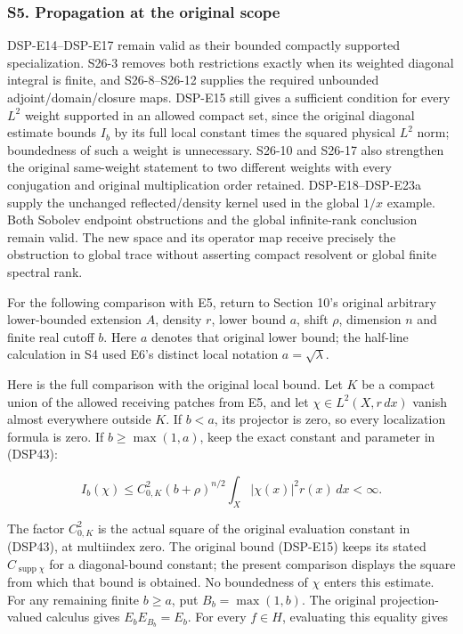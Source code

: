 \documentclass[
  11pt,
]{article}
\makeatletter
\let\ReaderOriginalAnchorStart\hyper@anchorstart
\let\ReaderOriginalAnchorEnd\hyper@anchorend
\let\ReaderPendingAliases\@empty
\def\ReaderArmAliases#1{\gdef\ReaderPendingAliases{#1}}
\def\hyper@anchorstart#1{\ReaderIfNativeAnchorTF{#1}{\ReaderPendingAliases\global\let\ReaderPendingAliases\@empty}{}\ReaderOriginalAnchorStart{#1}}
\makeatother
\begin{document}
\ReaderArmAliases{\ReaderOriginalAnchorStart{s5.-propagation-at-the-original-scope}\ReaderOriginalAnchorEnd}
\subsubsection{S5. Propagation at the original
scope}\label{s5.-propagation-at-the-original-scope}

DSP-E14--DSP-E17 remain valid as their bounded compactly supported
specialization. S26-3 removes both restrictions exactly when its
weighted diagonal integral is finite, and S26-8--S26-12 supplies the
required unbounded adjoint/domain/closure maps. DSP-E15 still gives a
sufficient condition for every \(L^2\) weight supported in an allowed
compact set, since the original diagonal estimate bounds \(I_b\) by its
full local constant times the squared physical \(L^2\) norm; boundedness
of such a weight is unnecessary. S26-10 and S26-17 also strengthen the
original same-weight statement to two different weights with every
conjugation and original multiplication order retained.
DSP-E18--DSP-E23a supply the unchanged reflected/density kernel used in
the global \(1/x\) example. Both Sobolev endpoint obstructions and the
global infinite-rank conclusion remain valid. The new space and its
operator map receive precisely the obstruction to global trace without
asserting compact resolvent or global finite spectral rank.

For the following comparison with E5, return to Section 10's original
arbitrary lower-bounded extension \(A\), density \(r\), lower bound
\(a\), shift \(\rho\), dimension \(n\) and finite real cutoff \(b\).
Here \(a\) denotes that original lower bound; the half-line calculation
in S4 used E6's distinct local notation \(a=\sqrt\lambda\).

Here is the full comparison with the original local bound. Let \(K\) be
a compact union of the allowed receiving patches from E5, and let
\(\chi\in L^2(X,r\,dx)\) vanish almost everywhere outside \(K\). If
\(b<a\), its projector is zero, so every localization formula is zero.
If \(b\ge\max(1,a)\), keep the exact constant and parameter in (DSP43):

\[
 I_b(\chi)
 \le C_{0,K}^2(b+\rho)^{n/2}\int_X|\chi(x)|^2r(x)\,dx<\infty.
\]

The factor \(C_{0,K}^2\) is the actual square of the original evaluation
constant in (DSP43), at multiindex zero. The original bound (DSP-E15)
keeps its stated \(C_{\operatorname{supp}\chi}\) for a diagonal-bound
constant; the present comparison displays the square from which that
bound is obtained. No boundedness of \(\chi\) enters this estimate. For
any remaining finite \(b\ge a\), put \(B_b=\max(1,b)\). The original
projection-valued calculus gives \(E_bE_{B_b}=E_b\). For every
\(f\in H\), evaluating this equality gives
\end{document}
